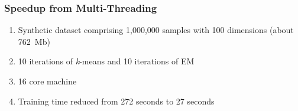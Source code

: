 \documentclass[usenames,dvipsnames]{beamer}
\begin{document}
\begin{frame}
\frametitle{Speedup from Multi-Threading}


\begin{enumerate}[{~~$\boldsymbol{\bullet}$}]

\item
Synthetic dataset comprising 1,000,000 samples with 100 dimensions  (about 762~Mb)

\item 10 iterations of {\it k}-means and 10 iterations of EM

\item 16 core machine

\item Training time reduced from 272 seconds to 27 seconds

\end{enumerate}




\end{frame}
\end{document}
